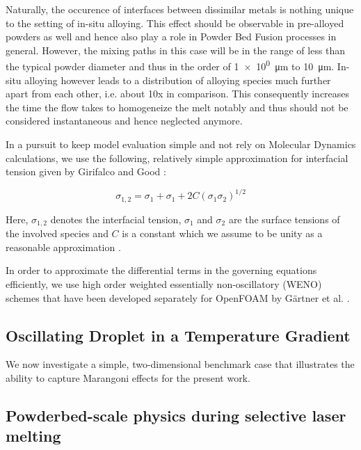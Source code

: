\documentclass[conference,final]{IEEEtran}
\begin{document}
Naturally, the occurence of interfaces between dissimilar metals is nothing unique to the setting of in-situ alloying. This effect should be observable in pre-alloyed powders as well and hence also play a role in Powder Bed Fusion processes in general. However, the mixing paths in this case will be in the range of less than the typical powder diameter and thus in the order of \SI[per-mode=fraction]{1e0}{\micro\metre} to \SI[per-mode=fraction]{10}{\micro\metre}. In-situ alloying however leads to a distribution of alloying species much further apart from each other, i.e. about 10x in comparison. This consequently increases the time the flow takes to homogeneize the melt notably and thus should not be considered instantaneous and hence neglected anymore.

In a pursuit to keep model evaluation simple and not rely on Molecular Dynamics calculations, we use the following, relatively simple approximation for interfacial tension given by Girifalco and Good \cite{girifalcoTheoryEstimationSurface1957}:

\begin{equation}
    \sigma_{1,2} = \sigma_1 + \sigma_1 + 2C (\sigma_1 \sigma_2)^{1/2}
\end{equation}

Here, $\sigma_{1,2}$ denotes the interfacial tension, $\sigma_1$ and $\sigma_2$ are the surface tensions of the involved species and $C$ is a constant which we assume to be unity as a reasonable approximation \cite{marmurCorrelatingInterfacialTensions2010}.

In order to approximate the differential terms in the governing equations efficiently, we use high order weighted essentially non-oscillatory (WENO) schemes that have been developed separately for OpenFOAM by Gärtner et al. \cite{gartnerEfficientWENOLibrary2020,martinImplementationValidationSemiImplicit2018}.

\subsection{Oscillating Droplet in a Temperature Gradient}

We now investigate a simple, two-dimensional benchmark case that illustrates the ability to capture Marangoni effects for the present work.

\subsection{Powderbed-scale physics during selective laser melting}
\end{document}
